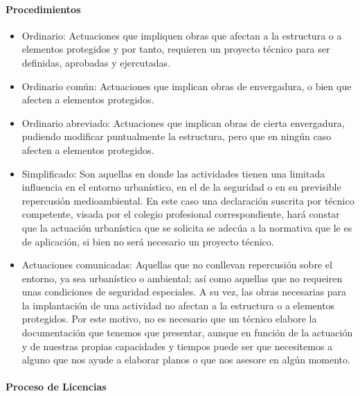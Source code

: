 \paragraph{Procedimientos}
\begin{itemize}
    \item Ordinario: Actuaciones que impliquen obras que afectan a la estructura o a elementos protegidos y por tanto, requieren un proyecto técnico para ser definidas, aprobadas y ejercutadas.
    \item Ordinario común: Actuaciones que implican obras de envergadura, o bien que afecten a elementos protegidos.
    \item Ordinario abreviado: Actuaciones que implican obras de cierta envergadura, pudiendo modificar puntualmente la estructura, pero que en ningún caso afecten a elementos protegidos.
    \item Simplificado: Son aquellas en donde las actividades tienen una limitada influencia en el entorno urbanístico, en el de la seguridad o en su previsible repercusión medioambiental. En este caso una declaración suscrita por técnico competente, visada por el colegio profesional correspondiente, hará constar que la actuación urbanística que se solicita se adecúa a la normativa que le es de aplicación, si bien no será necesario un proyecto técnico.
    \item Actuaciones comunicadas: Aquellas que no conllevan repercusión sobre el entorno, ya sea urbanístico o ambiental; así como aquellas que no requeiren unas condiciones de seguridad especiales. A su vez, las obras necesarias para la implantación de una actividad no afectan a la estructura o a elementos protegidos.
    Por este motivo, no es necesario que un técnico elabore la documentación que tenemos que presentar, aunque en función de la actuación y de nuestras propias capacidades y tiempos puede ser que necesitemos a alguno que nos ayude a elaborar planos o que nos asesore en algún momento.
\end{itemize}

\paragraph{Proceso de Licencias}

